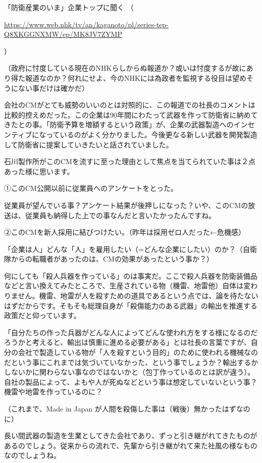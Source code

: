 \documentclass[facebook_diary.tex]{subfiles}
\begin{document}
「防衛産業のいま」企業トップに聞く （ 

\url{https://www.web.nhk/tv/an/kaganoto/pl/series-tep-Q8XKGGNXMW/ep/MK8JV7ZYMP}

 ）

（政府に忖度している現在のNHKらしからぬ報道か？或いは忖度するが故にあり得た報道なのか？何れにせよ、今のNHKには為政者を監視する役目は望めそうにない事だけは確かだ）


会社のCMがとても威勢のいいのとは対照的に、この報道での社長のコメントは比較的控えめだった。この企業は90年間にわたって武器を作って防衛省に納めてきたとの事。「防衛予算を増額するという政策」が、企業の武器製造へのインセンティブになっているのがよく分かりました。今後更なる新しい武器を開発製造して防衛省に提案していきたいと話されていました。


石川製作所がこのCMを流すに至った理由として焦点を当てられていた事は２点あった様に思います。

①このCM公開以前に従業員へのアンケートをとった。

従業員が望んでいる事？アンケート結果が後押しになった？いや、このCMの放送は、従業員も納得した上での事なんだと言いたかったんですね。

②このCMを新人採用に結びつけたい。（昨年は採用ゼロ人だった←危機感）

「企業は人」どんな「人」を雇用したい（=どんな企業にしたい）のか？（自衛隊からの転職者があったのは、CMの効果があったという事か？）


何にしても「殺人兵器を作っている」のは事実だ。ここで殺人兵器を防衛装備品などと言い換えてみたところで、生産されている物（機雷、地雷他）自体は変わりません。機雷、地雷が人を殺すための道具であるという点では、論を待たないはずだからです。そもそも総理自身が「殺傷能力のある武器」の輸出を推進する政策だと仰っています。

「自分たちの作った兵器がどんな人によってどんな使われ方をする様になるのだろうかと考えると、輸出は慎重に進める必要がある」とは社長の言葉ですが、自分の会社で製造している物が「人を殺すという目的」のために使われる機械なのだという事にこれまでは気づいていなかった、という事でしょうか？輸出するかしないかに関わらない事なのではないかと（包丁作っているのとは訳が違う）。自社の製品によって、よもや人が死ぬなどという事は想定していないという事？機雷や地雷を作っているのに？

（これまで、Made in Japan が人間を殺傷した事は（戦後）無かったはずなのに）


長い間武器の製造を生業としてきた会社であり、ずっと引き継がれてきたものがあるのでしょう。従来からの流れで、先輩から引き継がれて来た社風の様なものなのでしょうね。
\end{document}
